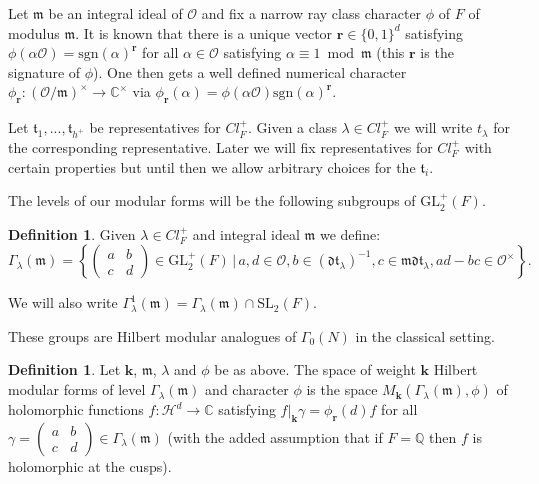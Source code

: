 \documentclass[a4paper,oneside]{amsart}
\theoremstyle{plain}
\theoremstyle{definition}
\newtheorem{define}[thm]{Definition}
\begin{document}
Let $\mathfrak{m}$ be an integral ideal of $\mathcal{O}$ and fix a narrow ray class character $\phi$ of $F$ of modulus $\mathfrak{m}$. It is known that there is a unique vector $\textbf{r}\in \{0,1\}^d$ satisfying $\phi(\alpha\mathcal{O}) = \text{sgn}(\alpha)^{\textbf{r}}$ for all $\alpha\in\mathcal{O}$ satisfying $\alpha\equiv 1\bmod \mathfrak{m}$ (this $\textbf{r}$ is the signature of $\phi$). One then gets a well defined numerical character $\phi_{\textbf{r}}: \left(\mathcal{O}/\mathfrak{m}\right)^{\times} \rightarrow \mathbb{C}^{\times}$ via $\phi_\textbf{r}(\alpha) = \phi(\alpha\mathcal{O})\text{sgn}(\alpha)^{\textbf{r}}$.

Let $\mathfrak{t}_1,...,\mathfrak{t}_{h^{+}}$ be representatives for $Cl^{+}_F$. Given a class $\lambda\in Cl^{+}_F$ we will write $t_{\lambda}$ for the corresponding representative. Later we will fix representatives for $Cl^{+}_F$ with certain properties but until then we allow arbitrary choices for the $\mathfrak{t}_i$.

The levels of our modular forms will be the following subgroups of $\text{GL}^{+}_2(F)$.

\begin{define}
Given $\lambda\in Cl^{+}_F$ and integral ideal $\mathfrak{m}$ we define: \[\Gamma_\lambda(\mathfrak{m}) = \left\{\left(\begin{array}{cc}a&b\\ c&d\end{array}\right)\in\text{GL}^{+}_2(F)\,\big|\, a,d\in\mathcal{O}, b\in(\mathfrak{dt}_{\lambda})^{-1}, c\in \mathfrak{mdt}_{\lambda}, ad-bc\in\mathcal{O}^{\times}\right\}.\]

We will also write $\Gamma^1_{\lambda}(\mathfrak{m}) = \Gamma_{\lambda}(\mathfrak{m})\cap \text{SL}_2(F)$.
\end{define}

These groups are Hilbert modular analogues of $\Gamma_0(N)$ in the classical setting.

\begin{define}
Let $\textbf{k}$, $\mathfrak{m}$, $\lambda$ and $\phi$ be as above. The space of weight $\textbf{k}$ Hilbert modular forms of level $\Gamma_\lambda(\mathfrak{m})$ and character $\phi$ is the space $M_{\textbf{k}}(\Gamma_{\lambda}(\mathfrak{m}),\phi)$ of holomorphic functions $f:\mathcal{H}^d \longrightarrow\mathbb{C}$ satisfying $f|_{\textbf{k}}\gamma = \phi_{\textbf{r}}(d)f$ for all $\gamma = \left(\begin{array}{cc}a&b\\ c&d\end{array}\right)\in\Gamma_{\lambda}(\mathfrak{m})$ (with the added assumption that if $F = \mathbb{Q}$ then $f$ is holomorphic at the cusps).
\end{define}
\end{document}
